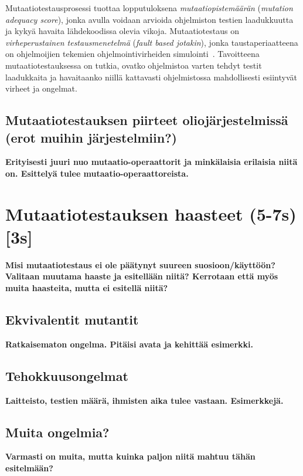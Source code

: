 \documentclass[finnish, grading]{tktltiki2}
\theoremstyle{definition}
\theoremstyle{remark}
\begin{document}
Mutaatiotestausprosessi tuottaa lopputuloksena \textit{mutaatiopistemäärän} (\textit{mutation adequacy score}), jonka avulla voidaan arvioida ohjelmiston testien laadukkuutta ja kykyä havaita lähdekoodissa olevia vikoja. Mutaatiotestaus on \textit{virheperustainen testausmenetelmä} (\textit{fault based jotakin}), jonka taustaperiaatteena on ohjelmoijien tekemien ohjelmointivirheiden simulointi~\cite[s. 649]{Jia:Harman:2011}. Tavoitteena mutaatiotestauksessa on tutkia, ovatko ohjelmistoa varten tehdyt testit laadukkaita ja havaitaanko niillä kattavasti ohjelmistossa mahdollisesti esiintyvät virheet ja ongelmat. 


\subsection{Mutaatiotestauksen piirteet oliojärjestelmissä (erot muihin järjestelmiin?)}

\textbf{Erityisesti juuri nuo mutaatio-operaattorit ja minkälaisia erilaisia niitä on. Esittelyä tulee mutaatio-operaattoreista.}

\section{Mutaatiotestauksen haasteet (5-7s) [3s]}

\textbf{Misi mutaatiotestaus ei ole päätynyt suureen suosioon/käyttöön? Valitaan muutama haaste ja esitellään niitä? Kerrotaan että myös muita haasteita, mutta ei esitellä niitä?}

\subsection{Ekvivalentit mutantit}

\textbf{Ratkaisematon ongelma. Pitäisi avata ja kehittää esimerkki.}

\subsection{Tehokkuusongelmat}

\textbf{Laitteisto, testien määrä, ihmisten aika tulee vastaan. Esimerkkejä.}

\subsection{Muita ongelmia?}

\textbf{Varmasti on muita, mutta kuinka paljon niitä mahtuu tähän esitelmään?}
\end{document}
